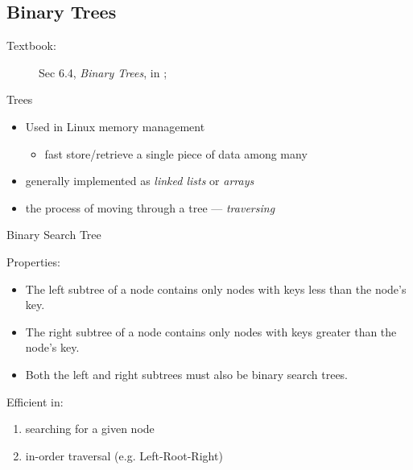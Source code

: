 \subsection{Binary Trees}
\label{sec:searching}

\begin{description}
\item[Textbook:] Sec 6.4, \emph{Binary Trees}, in \cite{love2010linux};
\end{description}

\begin{frame}{Trees}
  \begin{itemize}
  \item Used in Linux memory management
    \begin{itemize}
    \item fast store/retrieve a single piece of data among many
    \end{itemize}
  \item generally implemented as \emph{linked lists} or \emph{arrays}
  \item the process of moving through a tree --- \emph{traversing}
  \end{itemize}
\end{frame}

\begin{frame}{Binary Search Tree}
  \begin{center}
  \end{center}
  \begin{block}{Properties:}
    \begin{itemize}
    \item The left subtree of a node contains only nodes with keys less than the node's
      key.
    \item The right subtree of a node contains only nodes with keys greater than the
      node's key.
    \item Both the left and right subtrees must also be binary search trees.
    \end{itemize}
  \end{block}
  Efficient in:
  \begin{enumerate}
  \item searching for a given node
  \item in-order traversal (e.g. Left-Root-Right)
  \end{enumerate}
\end{frame}


